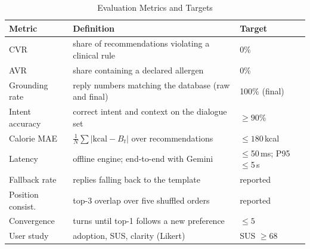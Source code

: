\begin{table}[t]
    \centering
    \caption{Evaluation Metrics and Targets}
    \label{tab:metrics}
    \footnotesize
    \setlength{\tabcolsep}{3pt}
    \begin{tabular}{@{}p{1.75cm}p{4.55cm}p{1.55cm}@{}}
        \toprule
        Metric & Definition & Target \\
        \midrule
        CVR & share of recommendations violating a clinical rule
            & 0\% \\
        AVR & share containing a declared allergen & 0\% \\
        Grounding rate & reply numbers matching the database (raw and final)
            & 100\% (final) \\
        Intent accuracy & correct intent and context on the dialogue set & $\ge 90$\% \\
        Calorie MAE & $\frac{1}{N}\sum |\text{kcal} - B_t|$ over recommendations
            & $\le 180$\,kcal \\
        Latency & offline engine; end-to-end with Gemini & $\le$50\,ms; P95 $\le$5\,s \\
        Fallback rate & replies falling back to the template & reported \\
        Position consist. & top-3 overlap over five shuffled orders & reported \\
        Convergence & turns until top-1 follows a new preference & $\le 5$ \\
        User study & adoption, SUS, clarity (Likert) & SUS $\ge 68$ \\
        \bottomrule
    \end{tabular}
\end{table}
